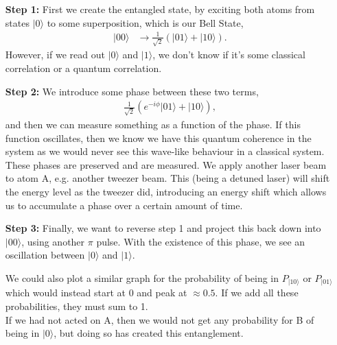 \documentclass[a4paper, 11pt, normalem]{report}
\begin{document}
\begin{itemize}
    \item[\textbf{Step 1:}] First we create the entangled state, by exciting both atoms from states $|0\rangle$ to some superposition, which is our Bell State,
        \begin{align*}
            |00\rangle &\to \frac{1}{\sqrt{2}}(|01\rangle+|10\rangle).
        \end{align*}
        However, if we read out $|0\rangle$ and $|1\rangle$, we don't know if it's some classical correlation or a quantum correlation. 
    \item[\textbf{Step 2:}] We introduce some phase between these two terms, 
        \begin{align*}
            \frac{1}{\sqrt{2}}(e^{-i\phi}|01\rangle+|10\rangle),
        \end{align*}
        and then we can measure something as a function of the phase. 
        If this function oscillates, then we know we have this quantum coherence in the system as we would never see this wave-like behaviour in a classical system. 
        These phases are preserved and are measured. 
        We apply another laser beam to atom A, e.g. another tweezer beam. 
        This (being a detuned laser) will shift the energy level as the tweezer did, introducing an energy shift which allows us to accumulate a phase over a certain amount of time. 
    \item[\textbf{Step 3:}] Finally, we want to reverse step 1 and project this back down into $|00\rangle$, using another $\pi$ pulse.
        With the existence of this phase, we see an oscillation between $|0\rangle$ and $|1\rangle$.
    \begin{figure}[H]
        \centering
        \vspace{-20pt}
    \end{figure}
    We could also plot a similar graph for the probability of being in $P_{|10\rangle}$ or $P_{|01\rangle}$ which would instead start at 0 and peak at $\approx0.5$. 
    If we add all these probabilities, they must sum to 1. \\
    If we had not acted on A, then we would not get any probability for B of being in $|0\rangle$, but doing so has created this entanglement.
\end{itemize}
\end{document}
